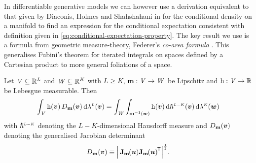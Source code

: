 In differentiable generative models we can however use a derivation equivalent to that given by Diaconis, Holmes and Shahshahani in \citep{diaconis2013sampling} for the conditional density on a manifold to find an expression for the conditional expectation consistent with definition given in \eqref{eq:conditional-expectation-property}. %
The key result we use is a formula from geometric measure-theory, Federer's \emph{co-area formula} \citep[\S 3.2.12]{federer2014geometric}. This generalises Fubini's theorem for iterated integrals on spaces defined by a Cartesian product to more general foliations of a space.%
\begin{theorem}\label{thm:co-area-formula}
Let $\mathit{V} \subseteq \mathbb{R}^L$ and $\mathit{W} \subseteq \mathbb{R}^K$ with $L \geq K$, ${\mathbf{m}}:\mathit{V}\to\mathit{W}$ be Lipschitz and $\mathrm{h} : \mathit{V} \to \mathbb{R}$ be Lebesgue measurable. Then
\begin{equation}\label{eq:co-area-formula}
    \int_{\set{V}} 
      \func{h}(\vct{v}) \, \jacobproddet{\vctfunc{m}}{\vct{v}}
    \,\dr\lebm{L}(\vct{v})
    = 
    \int_{\set{W}}
      \int_{\preimage{\vctfunc{m}}{\vct{w}}} \func{h}(\vct{v}) \,\dr\haum{L-K}(\vct{v})
    \,\dr\lebm{K}(\vct{w})
\end{equation}
with $\haum{L-K}$ denoting the $L-K$-dimensional Hausdorff measure and $\jacobproddet{\vctfunc{m}}{\vct{v}}$ denoting the generalised Jacobian determinant
\begin{equation}\label{eq:jacobian-product-det}
  \jacobproddet{\vctfunc{m}}{\vct{v}} \equiv 
  \left|\,\jacob{\vctfunc{m}}{\vct{u}}\jacob{\vctfunc{m}}{\vct{u}}\tr\right|^{\frac{1}{2}}.
\end{equation}
\end{theorem}
